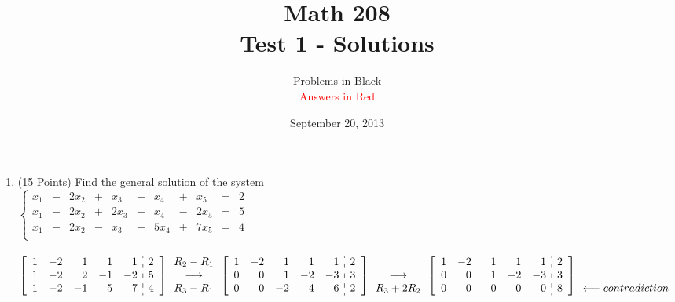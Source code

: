 \documentclass[12pt]{article}
\title{Math 208\\Test 1 - Solutions\\}
\date{September 20, 2013}
\author{Problems in Black\\\textcolor{red}{Answers in Red}}
\begin{document}
\maketitle
\begin{enumerate}
	\item (15 Points) Find the general solution of the system \\
		$\left\{\begin{array}{rrrrrrrrrrr}
	   	 	x_1 & - & 2x_2 & + & x_3 & + & x_4 & + & x_5 & = & 2\\
	   	 	x_1 & - & 2x_2 & + & 2x_3 & - & x_4 & - & 2x_5 & = & 5\\
	   		 x_1 & - & 2x_2 & - & x_3 & + & 5x_4 & + & 7x_5 & = & 4\\
		\end{array}\right.$ \\ \\
	\textcolor{red}{
	$\left[\begin{array}{rrrrr:r}
		1&-2&1&1&1&2\\
		1&-2&2&-1&-2&5\\
		1&-2&-1&5&7&4
	\end{array}\right]
	\begin{array}{c}
		R_2-R_1\\
		\longrightarrow\\
		R_3-R_1\\
	\end{array} 
	\left[\begin{array}{rrrrr:r}
		1&-2&1&1&1&2\\
		0&0&1&-2&-3&3\\
		0&0&-2&4&6&2
	\end{array}\right] 
	\begin{array}{c}
		\\
		\longrightarrow\\
		R_3+2R_2\\
	\end{array}\\
	\left[\begin{array}{rrrrr:r}
		1&-2&\hphantom{-}1&1&1&2\\
		0&0&1&-2&-3&3\\
		0&0&0&0&0&8
	\end{array}\right] 
	\begin{array}{c}
		\\
		\\
		\longleftarrow contradiction \\ 
	\end{array}$\\  \\ 
}
\end{enumerate}
\end{document}
